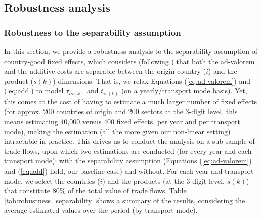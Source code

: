 \documentclass[a4paper,11pt]{article}
\begin{document}
\subsection{Robustness analysis \label{sec:robustness}}


\subsubsection{Robustness to the separability assumption}
In this section, we provide a robustness analysis to the separability assumption of country-good fixed effects, which considers (following \citealp{Irrazabal_2015}) that both the ad-valorem and the additive costs are separable between the origin country ($i$) and the product ($s(k)$) dimensions.
That is, we relax Equations (\ref{eq:ad-valorem}) and (\ref{eq:add}) to model $\tau_{is(k)}$ and $t_{is(k)}$ (on a yearly/transport mode basis).
Yet, this comes at the cost of having to estimate a much larger number of fixed effects (for approx. 200 countries of origin and 200 sectors at the 3-digit level, this means estimating 40,000 versus 400 fixed effects, per year and per transport mode), making the estimation (all the more given our non-linear setting) intractable in practice.
This drives us to conduct the analysis on a sub-sample of trade flows, upon which two estimations are conducted (for every year and each transport mode): with the separability assumption (Equations (\ref{eq:ad-valorem}) and (\ref{eq:add}) hold, our baseline case) and without.
For each year and transport mode, we select the countries ($i$) and the products (at the 3-digit level, $s(k)$) that constitute 80\% of the total value of trade flows. Table \ref{tab:robustness_separability} shows a summary of the results, considering the average estimated values over the period (by transport mode).
%
\end{document}
